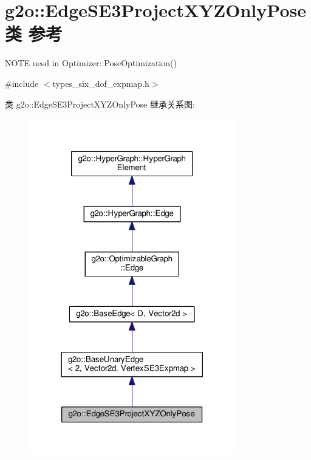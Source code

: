 \hypertarget{classg2o_1_1EdgeSE3ProjectXYZOnlyPose}{\section{g2o\-:\-:Edge\-S\-E3\-Project\-X\-Y\-Z\-Only\-Pose类 参考}
\label{classg2o_1_1EdgeSE3ProjectXYZOnlyPose}
}


N\-O\-T\-E uesd in Optimizer\-::\-Pose\-Optimization()  




{\ttfamily \#include $<$types\-\_\-six\-\_\-dof\-\_\-expmap.\-h$>$}



类 g2o\-:\-:Edge\-S\-E3\-Project\-X\-Y\-Z\-Only\-Pose 继承关系图\-:
\nopagebreak
\begin{figure}[H]
\begin{center}
\leavevmode
\includegraphics[width=254pt]{classg2o_1_1EdgeSE3ProjectXYZOnlyPose__inherit__graph}
\end{center}
\end{figure}


